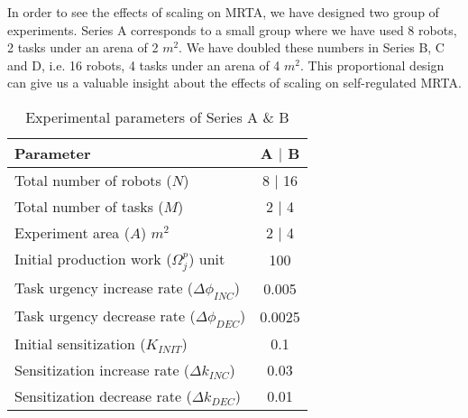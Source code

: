 \documentclass[journal]{IEEEtran}
\begin{document}
In order to see the effects of scaling on MRTA, we have designed two group of experiments. Series A corresponds to a small group where we have used 8 robots, 2 tasks under an arena of 2 $m^2$. We have doubled these numbers in Series B, C and D, i.e. 16 robots, 4 tasks under an arena of 4 $m^2$. This proportional design can give us a valuable insight about the effects of scaling on self-regulated MRTA. 
\begin{table}[t]
\caption{\small Experimental parameters of Series A \& B }
\label{table:params}
\begin{center}
\begin{small}
\begin{tabular}{|p{2in}|c|}
\hline Parameter &  A $\mid$  B\\
\hline Total number of robots ($N$) & \hspace*{0.1cm} 8 $\mid$ 16\\
\hline Total number of tasks ($M$) & 2 $\mid$ 4\\
\hline Experiment area ($A$) $m^2$  & 2 $\mid$  4 \\
\hline Initial production work ($\Omega_{j}^{p}$) unit & 100\\
\hline Task urgency increase rate ($\Delta\phi_{INC}$) & 0.005\\
\hline Task urgency decrease rate ($\Delta\phi_{DEC}$) & 0.0025\\
\hline Initial sensitization ($K_{INIT}$) & 0.1\\
\hline Sensitization increase rate ($\Delta k_{INC}$) & 0.03\\
\hline Sensitization decrease rate ($\Delta k_{DEC}$) & 0.01\\
\hline
\end{tabular}
\end{small}
\end{center}
\vspace*{-1cm}
\end{table}
\end{document}
